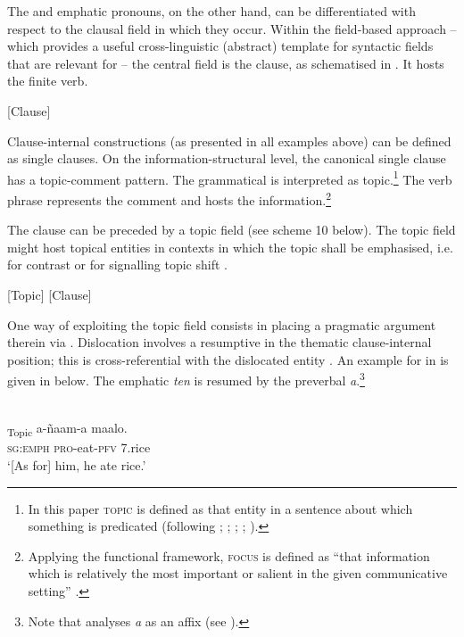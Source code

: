 \documentclass[output=paper
,newtxmath
,modfonts
,nonflat]{langsci/langscibook}
\begin{document}
The  and emphatic pronouns, on the other hand, can be differentiated with respect to the clausal field in which they occur. Within the field-based approach -- which provides a useful cross-linguistic (abstract) template for syntactic fields that are relevant for  \citep[see][]{Good2010,Güldemanninprep,Apeletal15} -- the central field is the clause, as schematised in . It hosts the finite verb.

\ea\label{ex:apel:9} [Clause]
\z

Clause-internal constructions (as presented in all examples above) can be defined as single clauses. On the information-structural level, the canonical single clause has a topic-comment pattern. The grammatical  is interpreted as topic.\footnote{In this paper \textsc{topic} is defined as that entity in a sentence about which something is predicated (following \citealt{Strawson1964}; \citealt{Hornby1971}; \citealt{Dik1997}; \citealt{Reinhart1982}; \citealt{Lambrecht1994}).} The verb phrase represents the comment and hosts the  information.\footnote{Applying the functional framework, \textsc{focus} is defined as “that information which is relatively the most important or salient in the given communicative setting” \citep[326]{Dik1997}.}

The clause can be preceded by a topic field (see scheme 10 below). The topic field might host topical entities in contexts in which the topic shall be emphasised, i.e. for contrast or for signalling topic shift \citep[see][153]{Givon76}.

\ea\label{ex:apel:10}
[Topic] [Clause]
\z

One way of exploiting the topic field consists in placing a pragmatic argument therein via . Dislocation involves a resumptive  in the thematic clause-internal position; this  is cross-referential with the dislocated entity \citep{GregoryMichaelis01,Lambrecht2001}. An example for  in  is given in  below. The emphatic  \textit{ten} is resumed by the preverbal  \textit{a}.\footnote{Note that \citet{Renaudier2012} analyses \textit{a} as an affix (see ).} 

\ea\label{ex:apel:11}{  \citep[53]{Renaudier2012}} \\
\gll   [Ten]\textsubscript{Topic} a-ñaam-a maalo.\\
     \textsc{sg:emph} \textsc{pro-}eat\textsc{-pfv} \textsc{7.}rice \\
\glt ‘[As for] him, he ate rice.’
\z
\end{document}
